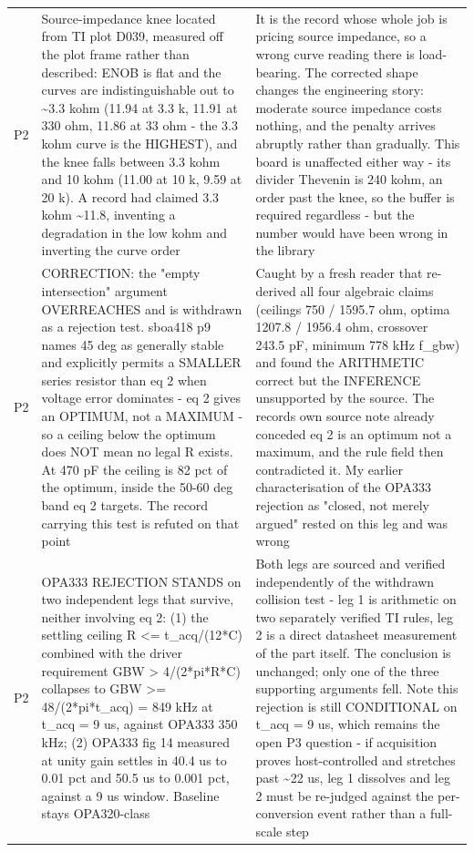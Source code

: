 \documentclass[11pt,a4paper]{article}
\begin{document}
{\begin{longtable}{lp{5.2cm}p{7.2cm}}
P2 & Source-impedance knee located from TI plot D039, measured off the plot frame rather than described: ENOB is flat and the curves are indistinguishable out to \textasciitilde{}3.3 kohm (11.94 at 3.3 k, 11.91 at 330 ohm, 11.86 at 33 ohm - the 3.3 kohm curve is the HIGHEST), and the knee falls between 3.3 kohm and 10 kohm (11.00 at 10 k, 9.59 at 20 k). A record had claimed 3.3 kohm \textasciitilde{}11.8, inventing a degradation in the low kohm and inverting the curve order & It is the record whose whole job is pricing source impedance, so a wrong curve reading there is load-bearing. The corrected shape changes the engineering story: moderate source impedance costs nothing, and the penalty arrives abruptly rather than gradually. This board is unaffected either way - its divider Thevenin is 240 kohm, an order past the knee, so the buffer is required regardless - but the number would have been wrong in the library \\
P2 & CORRECTION: the "empty intersection" argument OVERREACHES and is withdrawn as a rejection test. sboa418 p9 names 45 deg as generally stable and explicitly permits a SMALLER series resistor than eq 2 when voltage error dominates - eq 2 gives an OPTIMUM, not a MAXIMUM - so a ceiling below the optimum does NOT mean no legal R exists. At 470 pF the ceiling is 82 pct of the optimum, inside the 50-60 deg band eq 2 targets. The record carrying this test is refuted on that point & Caught by a fresh reader that re-derived all four algebraic claims (ceilings 750 / 1595.7 ohm, optima 1207.8 / 1956.4 ohm, crossover 243.5 pF, minimum 778 kHz f\_gbw) and found the ARITHMETIC correct but the INFERENCE unsupported by the source. The records own source note already conceded eq 2 is an optimum not a maximum, and the rule field then contradicted it. My earlier characterisation of the OPA333 rejection as "closed, not merely argued" rested on this leg and was wrong \\
P2 & OPA333 REJECTION STANDS on two independent legs that survive, neither involving eq 2: (1) the settling ceiling R \textless{}= t\_acq/(12{*}C) combined with the driver requirement GBW \textgreater{} 4/(2{*}pi{*}R{*}C) collapses to GBW \textgreater{}= 48/(2{*}pi{*}t\_acq) = 849 kHz at t\_acq = 9 us, against OPA333 350 kHz; (2) OPA333 fig 14 measured at unity gain settles in 40.4 us to 0.01 pct and 50.5 us to 0.001 pct, against a 9 us window. Baseline stays OPA320-class & Both legs are sourced and verified independently of the withdrawn collision test - leg 1 is arithmetic on two separately verified TI rules, leg 2 is a direct datasheet measurement of the part itself. The conclusion is unchanged; only one of the three supporting arguments fell. Note this rejection is still CONDITIONAL on t\_acq = 9 us, which remains the open P3 question - if acquisition proves host-controlled and stretches past \textasciitilde{}22 us, leg 1 dissolves and leg 2 must be re-judged against the per-conversion event rather than a full-scale step \\

\end{longtable}}
\end{document}
